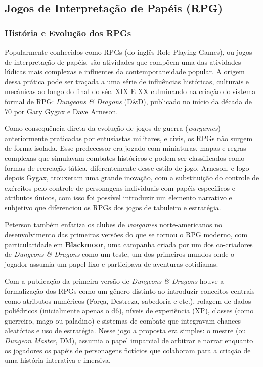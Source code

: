 \subsection{Jogos de Interpretação de Papéis (RPG)}

\subsubsection{História e Evolução dos RPGs}
Popularmente conhecidos como RPGs (do inglês Role-Playing Games), ou jogos de interpretação de papéis, são 
atividades que compõem uma das atividades lúdicas mais complexas e influentes da contemporaneidade popular. 
A origem dessa prática pode ser traçada a uma série de influências históricas, culturais e mecânicas ao longo 
do final do séc. XIX E XX culminando na criação do sistema formal de RPG: \textit{Dungeons \& Dragons} (D\&D), publicado 
no início da década de 70 por Gary Gygax e Dave Arneson. \cite{peterson2012playing, hitchens2007roleplaying}

Como consequência direta da evolução de jogos de guerra (\textit{wargames}) anteriormente praticadas por entusiastas 
militares, e civis, os RPGs não surgem de forma isolada. Esse predecessor era jogado com miniaturas, mapas e regras 
complexas que simulavam combates históricos e podem ser classificados como formas de recreação tática. diferentemente
desse estilo de jogo, Arneson, e logo depois Gygax, trouxeram uma grande inovação, com a substituição do controle de 
exércitos pelo controle de personagens individuais com papéis específicos e atributos únicos, com isso foi possível 
introduzir um elemento narrativo e subjetivo que diferenciou os RPGs dos jogos de tabuleiro e estratégia.
\cite{peterson2012playing}

Peterson\cite{peterson2012playing} também enfatiza os clubes de \textit{wargames} norte-americanos no desenvolvimento 
das primeiras versões do que se tornou o RPG moderno, com particularidade em \textbf{Blackmoor}, uma campanha criada por 
um dos co-criadores de \textit{Dungeons \& Dragons} como um teste, um dos primeiros mundos onde o jogador assumia um papel 
fixo e participava de aventuras cotidianas.

Com a publicação da primeira versão de \textit{Dungeons \& Dragons} houve a formalização dos RPGs como um gênero distinto ao 
introduzir conceitos centrais como atributos numéricos (Força, Destreza, sabedoria e etc.), rolagem de dados poliédricos 
(inicialmente apenas o d6), níveis de experiência (XP), classes (como guerreiro, mago ou paladino) e sistemas de combate 
que integravam chances aleatórias e uso de estratégia. Nesse jogo a proposta era simples: o mestre (ou \textit{Dungeon Master}, DM),
assumia o papel imparcial de arbitrar e narrar enquanto os jogadores os papéis de personagens fictícios que colaboram para 
a criação de uma história interativa e imersiva. \cite{witwer2018}

